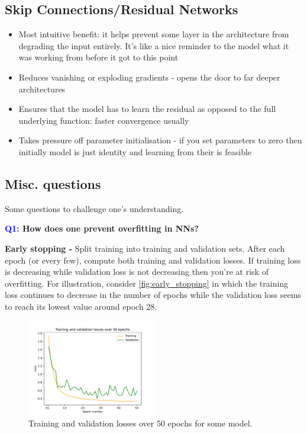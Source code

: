 \documentclass[11pt]{article}
\begin{document}
\subsection{Skip Connections/Residual Networks}
\begin{itemize}
    \item Most intuitive benefit: it helps prevent some layer in the architecture from degrading the input entirely. It's like a nice reminder to the model what it was working from before it got to this point
    \item Reduces vanishing or exploding gradients - opens the door to far deeper architectures
    \item Ensures that the model has to learn the residual as opposed to the full underlying function: faster convergence usually
    \item Takes pressure off parameter initialisation - if you set parameters to zero then initially model is just identity and learning from their is feasible
\end{itemize}

\subsection{Misc. questions}

Some questions to challenge one's understanding.

\begin{center}
    \textbf{\textcolor{blue}{Q1:} How does one prevent overfitting in NNs?}
\end{center}
\textbf{Early stopping -} Split training into training and validation sets. After each epoch (or every few), compute both training and validation losses. If training loss is decreasing while validation loss is not decreasing then you're at risk of overfitting. For illustration, consider \autoref{fig:early_stopping} in which the training loss continues to decrease in the number of epochs while the validation loss seems to reach its lowest value around epoch 28.

\begin{figure}[ht]
    \centering
    \includegraphics[width=0.5\textwidth]{./figures/neural_nets/early_stopping.pdf}
    \caption{Training and validation losses over 50 epochs for some model.}
    \label{fig:early_stopping}
\end{figure}
\end{document}
